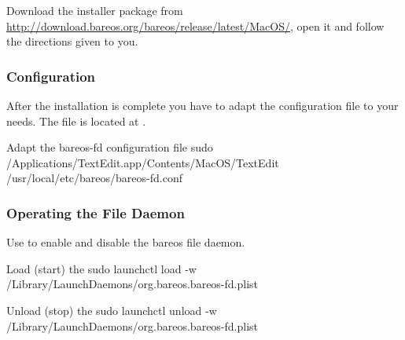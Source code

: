 Download the \bareosFd installer package from \url{http://download.bareos.org/bareos/release/latest/MacOS/},
open it and follow the directions given to you.

\subsubsection{Configuration}

After the installation is complete you have to adapt the configuration file to your needs. The file is located at .

\begin{commands}{Adapt the bareos-fd configuration file}
sudo /Applications/TextEdit.app/Contents/MacOS/TextEdit /usr/local/etc/bareos/bareos-fd.conf
\end{commands}

\subsubsection{Operating the File Daemon}

Use  to enable and disable the bareos file daemon.

\begin{commands}{Load (start) the \bareosFd}
sudo launchctl load -w /Library/LaunchDaemons/org.bareos.bareos-fd.plist
\end{commands}

\begin{commands}{Unload (stop) the \bareosFd}
sudo launchctl unload -w /Library/LaunchDaemons/org.bareos.bareos-fd.plist
\end{commands}
